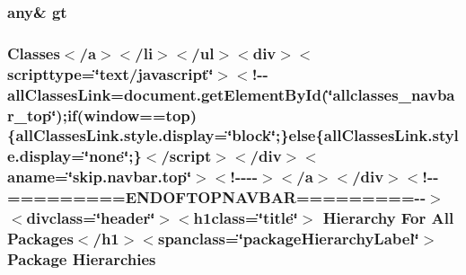 \hypertarget{overview-tree_8html_a1bb4447113f0bd7bf49e2b3dee2e065d}{
\subsubsection[{gt}]{\setlength{\rightskip}{0pt plus 5cm}any\& gt}}\label{overview-tree_8html_a1bb4447113f0bd7bf49e2b3dee2e065d}
\hypertarget{overview-tree_8html_ad90915afb629507b424558e50a736daf}{
\subsubsection[{Hierarchies}]{\setlength{\rightskip}{0pt plus 5cm}Classes$<$/{\bf a}$>$$<$/li$>$$<$/ul$>$$<$div$>$$<$scripttype=\char`\"{}text/javascript\char`\"{}$>$$<$!-\/-\/all\-Classes\-Link=document.\-get\-Element\-By\-Id(\char`\"{}allclasses\-\_\-navbar\-\_\-top\char`\"{});if(window==top)\{all\-Classes\-Link.\-style.\-display=\char`\"{}block\char`\"{};\}else\{all\-Classes\-Link.\-style.\-display=\char`\"{}none\char`\"{};\}$<$/script$>$$<$/div$>$$<$aname=\char`\"{}skip.\-navbar.\-top\char`\"{}$>$$<$!-\/-\/-\/-\/$>$$<$/a$>$$<$/div$>$$<$!-\/-\/=========E\-N\-D\-O\-F\-T\-O\-P\-N\-A\-V\-B\-A\-R=========-\/-\/$>$$<$divclass=\char`\"{}header\char`\"{}$>$$<$h1class=\char`\"{}title\char`\"{}$>$ Hierarchy For All Packages$<$/h1$>$$<$spanclass=\char`\"{}package\-Hierarchy\-Label\char`\"{}$>$ Package Hierarchies}}\label{overview-tree_8html_ad90915afb629507b424558e50a736daf}
